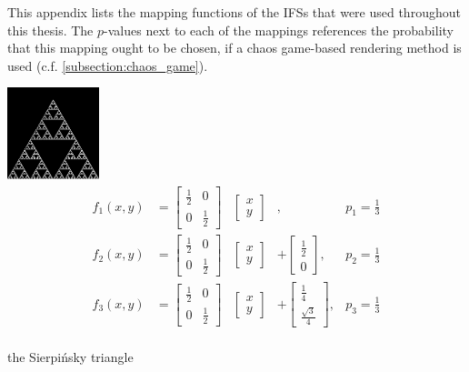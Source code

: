 \documentclass[11pt]{article}
\begin{document}
\label{appendix:ifss}

This appendix lists the mapping functions of the IFSs that were used throughout this thesis.
The \(p\)-values next to each of the mappings references the probability that this mapping ought to be chosen,
if a chaos game-based rendering method is used (c.f. \autoref{subsection:chaos_game}).


\begin{ifs}
\centering
\includegraphics[width=0.2\textwidth]{figures/sierpinsky}
$$ 
\begin{aligned}
f_1(x, y) &= \begin{bmatrix} \frac{1}{2} & 0 \\ 0 & \frac{1}{2} \end{bmatrix} & \begin{bmatrix} x \\ y \end{bmatrix} & , &p_1 = \frac{1}{3} \\
f_2(x, y) &= \begin{bmatrix} \frac{1}{2} & 0 \\ 0 & \frac{1}{2} \end{bmatrix} & \begin{bmatrix} x \\ y \end{bmatrix} &+ \begin{bmatrix} \frac{1}{2} \\ 0 \end{bmatrix} , &p_2 = \frac{1}{3} \\
f_3(x, y) &= \begin{bmatrix} \frac{1}{2} & 0 \\ 0 & \frac{1}{2} \end{bmatrix} & \begin{bmatrix} x \\ y \end{bmatrix} &+ \begin{bmatrix} \frac{1}{4} \\ \frac{\sqrt{3}}{4} \end{bmatrix} , &p_3 = \frac{1}{3} \\
\end{aligned}
$$

\caption{the Sierpi\'nsky triangle}
\label{ifs:sierpinsky}
\end{ifs}
\end{document}
